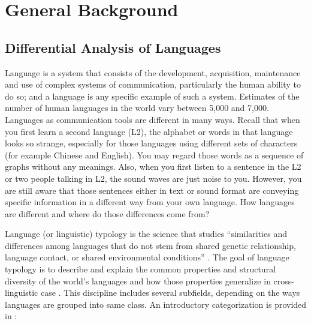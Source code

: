 \chapter{General Background}
\label{literature}

\section{Differential Analysis of Languages}

Language is a system that consists of the development, acquisition, maintenance and use of complex systems of communication, particularly the human ability to do so; and a language is any specific example of such a system. Estimates of the number of human languages in the world vary between 5,000 and 7,000. Languages as communication tools are different in many ways. Recall that when you first learn a second language (L2), the alphabet or words in that language looks so strange, especially for those languages using different sets of characters (for example Chinese and English). You may regard those words as a sequence of graphs without any meanings. Also, when you first listen to a sentence in the L2 or two people talking in L2, the sound waves are just noise to you. However, you are still aware that those sentences either in text or sound format are conveying specific information in a different way from your own language. How languages are different and where do those differences come from?

Language (or linguistic) typology is the science that studies ``similarities and differences among languages that do not stem from shared genetic relationship, language contact, or shared environmental conditions'' \citep{moravcsik_2012}. The goal of language typology is to describe and explain the common properties and structural diversity of the world's languages and how those properties generalize in cross-linguistic case \citep{bickel2001typology}. This discipline includes several subfields, depending on the ways languages are grouped into same class. An introductory categorization is provided in \citep{moravcsik2012introducing}:

